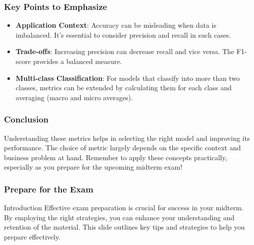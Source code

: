 \documentclass[aspectratio=169]{beamer}
\begin{document}
\begin{frame}[fragile]
    \frametitle{Key Points to Emphasize}
    \begin{itemize}
        \item \textbf{Application Context}: Accuracy can be misleading when data is imbalanced. It's essential to consider precision and recall in such cases.
        \item \textbf{Trade-offs}: Increasing precision can decrease recall and vice versa. The F1-score provides a balanced measure.
        \item \textbf{Multi-class Classification}: For models that classify into more than two classes, metrics can be extended by calculating them for each class and averaging (macro and micro averages).
    \end{itemize}
\end{frame}

\begin{frame}[fragile]
    \frametitle{Conclusion}
    Understanding these metrics helps in selecting the right model and improving its performance. The choice of metric largely depends on the specific context and business problem at hand. Remember to apply these concepts practically, especially as you prepare for the upcoming midterm exam!
\end{frame}

\begin{frame}[fragile]
    \frametitle{Prepare for the Exam}
    \begin{block}{Introduction}
        Effective exam preparation is crucial for success in your midterm. By employing the right strategies, you can enhance your understanding and retention of the material. This slide outlines key tips and strategies to help you prepare effectively.
    \end{block}
\end{frame}
\end{document}
